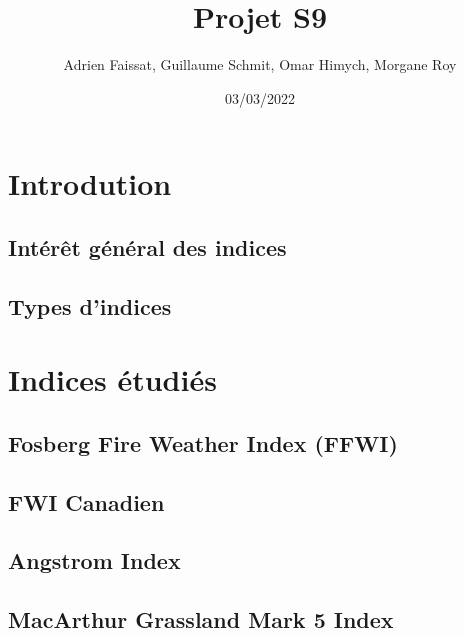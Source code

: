 \documentclass[
]{article}
\title{Projet S9}
\author{Adrien Faissat, Guillaume Schmit, Omar Himych, Morgane Roy}
\date{03/03/2022}
\begin{document}
\maketitle

{
\setcounter{tocdepth}{3}
\tableofcontents
}
\hypertarget{introdution}{%
\section{Introdution}\label{introdution}}

\hypertarget{intuxe9ruxeat-guxe9nuxe9ral-des-indices}{%
\subsection{Intérêt général des
indices}\label{intuxe9ruxeat-guxe9nuxe9ral-des-indices}}

\hypertarget{types-dindices}{%
\subsection{Types d'indices}\label{types-dindices}}

\hypertarget{indices-uxe9tudiuxe9s}{%
\section{Indices étudiés}\label{indices-uxe9tudiuxe9s}}

\hypertarget{fosberg-fire-weather-index-ffwi}{%
\subsection{Fosberg Fire Weather Index
(FFWI)}\label{fosberg-fire-weather-index-ffwi}}

\hypertarget{fwi-canadien}{%
\subsection{FWI Canadien}\label{fwi-canadien}}

\hypertarget{angstrom-index}{%
\subsection{Angstrom Index}\label{angstrom-index}}

\hypertarget{macarthur-grassland-mark-5-index}{%
\subsection{MacArthur Grassland Mark 5
Index}\label{macarthur-grassland-mark-5-index}}
\end{document}
